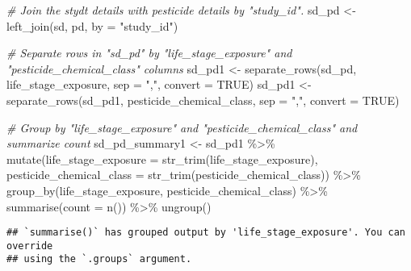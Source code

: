 \documentclass[
]{article}
\newenvironment{Shaded}{\begin{snugshade}}{\end{snugshade}}
\newcommand{\AttributeTok}[1]{\textcolor[rgb]{0.77,0.63,0.00}{#1}}
\newcommand{\CommentTok}[1]{\textcolor[rgb]{0.56,0.35,0.01}{\textit{#1}}}
\newcommand{\ConstantTok}[1]{\textcolor[rgb]{0.00,0.00,0.00}{#1}}
\newcommand{\FunctionTok}[1]{\textcolor[rgb]{0.00,0.00,0.00}{#1}}
\newcommand{\NormalTok}[1]{#1}
\newcommand{\OtherTok}[1]{\textcolor[rgb]{0.56,0.35,0.01}{#1}}
\newcommand{\SpecialCharTok}[1]{\textcolor[rgb]{0.00,0.00,0.00}{#1}}
\newcommand{\StringTok}[1]{\textcolor[rgb]{0.31,0.60,0.02}{#1}}
\begin{document}
\begin{Shaded}
\begin{Highlighting}[]
\CommentTok{\# Join the stydt details with pesticide details by "study\_id". }
\NormalTok{sd\_pd }\OtherTok{\textless{}{-}} \FunctionTok{left\_join}\NormalTok{(sd, pd, }\AttributeTok{by =} \StringTok{"study\_id"}\NormalTok{)}

\CommentTok{\# Separate rows in "sd\_pd" by "life\_stage\_exposure" and "pesticide\_chemical\_class" columns}
\NormalTok{sd\_pd1 }\OtherTok{\textless{}{-}} \FunctionTok{separate\_rows}\NormalTok{(sd\_pd, life\_stage\_exposure, }\AttributeTok{sep =} \StringTok{","}\NormalTok{, }\AttributeTok{convert =} \ConstantTok{TRUE}\NormalTok{)}
\NormalTok{sd\_pd1 }\OtherTok{\textless{}{-}} \FunctionTok{separate\_rows}\NormalTok{(sd\_pd1, pesticide\_chemical\_class, }\AttributeTok{sep =} \StringTok{","}\NormalTok{, }\AttributeTok{convert =} \ConstantTok{TRUE}\NormalTok{)}

\CommentTok{\# Group by "life\_stage\_exposure" and "pesticide\_chemical\_class" and summarize count}
\NormalTok{sd\_pd\_summary1 }\OtherTok{\textless{}{-}}\NormalTok{ sd\_pd1 }\SpecialCharTok{\%\textgreater{}\%}
  \FunctionTok{mutate}\NormalTok{(}\AttributeTok{life\_stage\_exposure =} \FunctionTok{str\_trim}\NormalTok{(life\_stage\_exposure),}
         \AttributeTok{pesticide\_chemical\_class =} \FunctionTok{str\_trim}\NormalTok{(pesticide\_chemical\_class)) }\SpecialCharTok{\%\textgreater{}\%}
  \FunctionTok{group\_by}\NormalTok{(life\_stage\_exposure, pesticide\_chemical\_class) }\SpecialCharTok{\%\textgreater{}\%}
  \FunctionTok{summarise}\NormalTok{(}\AttributeTok{count =} \FunctionTok{n}\NormalTok{()) }\SpecialCharTok{\%\textgreater{}\%}
  \FunctionTok{ungroup}\NormalTok{()}
\end{Highlighting}
\end{Shaded}

\begin{verbatim}
## `summarise()` has grouped output by 'life_stage_exposure'. You can override
## using the `.groups` argument.
\end{verbatim}
\end{document}
